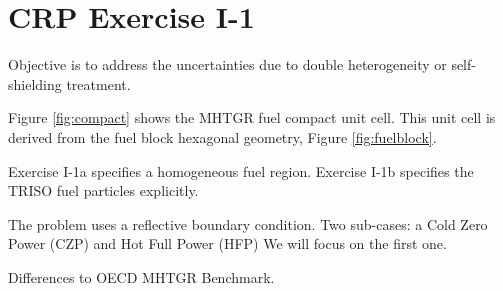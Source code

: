 \documentclass[11pt,letterpaper]{article}
\begin{document}
\section{CRP Exercise I-1}

Objective is to address the uncertainties due to double heterogeneity or self-shielding treatment.

Figure \ref{fig:compact} shows the MHTGR fuel compact unit cell.
This unit cell is derived from the fuel block hexagonal geometry, Figure \ref{fig:fuelblock}.

Exercise I-1a specifies a homogeneous fuel region.
Exercise I-1b specifies the TRISO fuel particles explicitly.

The problem uses a reflective boundary condition.
Two sub-cases: a Cold Zero Power (CZP) and Hot Full Power (HFP)
We will focus on the first one.

Differences to OECD MHTGR Benchmark.
\end{document}
